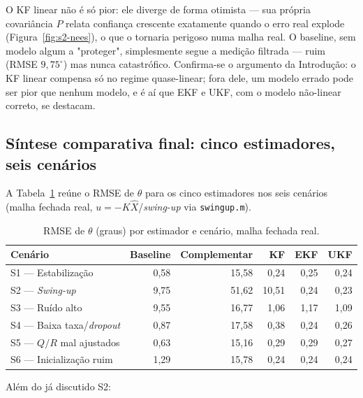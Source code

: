 \documentclass[brazil, 12pt]{article}
\begin{document}
O KF linear não é só pior: ele diverge de forma otimista --- sua própria
covariância $P$ relata confiança crescente exatamente quando o erro real
explode (Figura~\ref{fig:s2-nees}), o que o tornaria perigoso numa malha real.
O baseline, sem modelo algum a "proteger", simplesmente segue a medição
filtrada --- ruim (RMSE $9{,}75^{\circ}$) mas nunca catastrófico. Confirma-se
o argumento da Introdução: o KF linear compensa só no regime quase-linear;
fora dele, um modelo errado pode ser pior que nenhum modelo, e é aí que EKF e
UKF, com o modelo não-linear correto, se destacam.

\subsection{Síntese comparativa final: cinco estimadores, seis cenários}
\label{sec:sintese-final}

A Tabela~\ref{tab:rmse-final} reúne o RMSE de $\theta$ para os cinco
estimadores nos seis cenários (malha fechada real, $u=-K\hat X$/\emph{swing-up}
via \texttt{swingup.m}).

\begin{table}[H]
\centering
\small
\begin{tabular}{@{}l r r r r r@{}}
\hline
\textbf{Cenário} & \textbf{Baseline} & \textbf{Complementar} & \textbf{KF} & \textbf{EKF} & \textbf{UKF} \\
\hline
S1 — Estabilização        &  0,58 & 15,58 &  0,24 & 0,25 & 0,24 \\
S2 — \emph{Swing-up}      &  9,75 & 51,62 & 10,51 & 0,24 & 0,23 \\
S3 — Ruído alto            &  9,55 & 16,77 &  1,06 & 1,17 & 1,09 \\
S4 — Baixa taxa/\emph{dropout} &  0,87 & 17,58 &  0,38 & 0,24 & 0,26 \\
S5 — $Q/R$ mal ajustados   &  0,63 & 15,16 &  0,29 & 0,29 & 0,27 \\
S6 — Inicialização ruim    &  1,29 & 15,78 &  0,24 & 0,24 & 0,24 \\
\hline
\end{tabular}
\caption{RMSE de $\theta$ (graus) por estimador e cenário, malha fechada real.}
\label{tab:rmse-final}
\end{table}

Além do já discutido S2:
\end{document}
